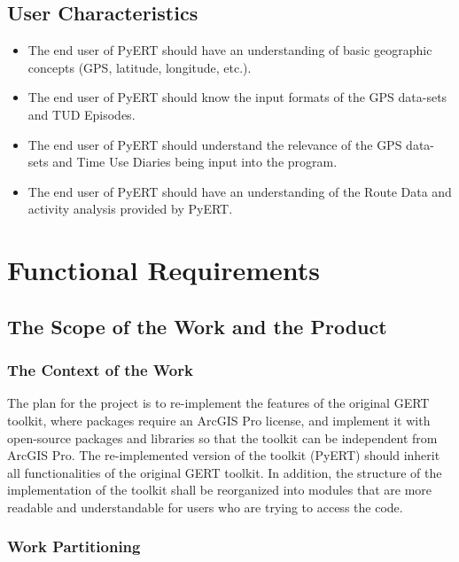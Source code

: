 \documentclass[12pt, titlepage]{article}
\begin{document}
\subsection{User Characteristics}
\begin{itemize}
    \item The end user of PyERT should have an understanding of basic geographic concepts (GPS, latitude, longitude, etc.).
    \item The end user of PyERT should know the input formats of the GPS data-sets and TUD Episodes.
    \item The end user of PyERT should understand the relevance of the GPS data-sets and Time Use Diaries being input into the program.
    \item The end user of PyERT should have an understanding of the Route Data and activity analysis provided by PyERT.
\end{itemize}
\section{Functional Requirements}
\subsection{The Scope of the Work and the Product}

\subsubsection{The Context of the Work}
The plan for the project is to re-implement the features of the original GERT toolkit, where packages require an ArcGIS Pro license, and implement it with open-source packages and libraries so that the toolkit can be independent from ArcGIS Pro. The re-implemented version of the toolkit (PyERT) should inherit all functionalities of the original GERT toolkit. In addition, the structure of the implementation of the toolkit shall be reorganized into modules that are more readable and understandable for users who are trying to access the code.

\subsubsection{Work Partitioning}
\end{document}
